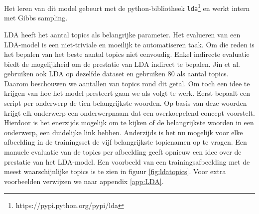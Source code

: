 Het leren van dit model gebeurt met de python-bibliotheek \texttt{lda}\footnote{https://pypi.python.org/pypi/lda} en werkt intern met Gibbs sampling.

LDA heeft het aantal topics als belangrijke parameter. Het evalueren van een LDA-model is een niet-triviale en moeilijk te automatiseren taak. Om die reden is het bepalen van het beste aantal topics niet eenvoudig. Enkel indirecte evaluatie biedt de mogelijkheid om de prestatie van LDA indirect te bepalen. Jin et al.\cite{Jin2015} gebruiken ook LDA op dezelfde dataset en gebruiken 80 als aantal topics. Daarom beschouwen we aantallen van topics rond dit getal. 
Om toch een idee te krijgen van hoe het model presteert gaan we als volgt te werk. Eerst bepaalt een script per onderwerp de tien belangrijkste woorden. Op basis van deze woorden krijgt elk onderwerp een onderwerpnaam dat een overkoepelend concept voorstelt. 
Hierdoor is het enerzijds mogelijk om te kijken of de belangrijkste woorden in een onderwerp, een duidelijke link hebben. Anderzijds is het nu mogelijk voor elke afbeelding in de trainingsset de vijf belangrijkste topicnamen op te vragen. Een manuele evaluatie van de topics per afbeelding geeft opnieuw een idee over de prestatie van het LDA-model. Een voorbeeld van een trainingsafbeelding met de meest waarschijnlijke topics is te zien in figuur \ref{fig:ldatopics}. Voor extra voorbeelden verwijzen we naar appendix \ref{app:LDA}.

